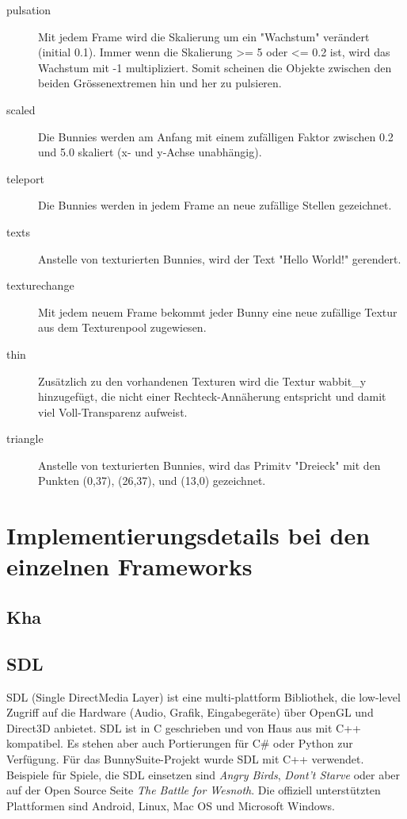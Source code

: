 \begin{description}
\item[pulsation] Mit jedem Frame wird die Skalierung um ein "Wachstum" verändert (initial 0.1). Immer wenn die Skalierung \textgreater= 5 oder \textless= 0.2 ist, wird das Wachstum mit -1 multipliziert. Somit scheinen die Objekte zwischen den beiden Grössenextremen hin und her zu pulsieren. \\
\item[scaled] Die Bunnies werden am Anfang mit einem zufälligen Faktor zwischen 0.2 und 5.0 skaliert (x- und y-Achse unabhängig). \\
\item[teleport] Die Bunnies werden in jedem Frame an neue zufällige Stellen gezeichnet. \\
\item[texts] Anstelle von texturierten Bunnies, wird der Text "Hello World!" gerendert. \\
\item[texturechange] Mit jedem neuem Frame bekommt jeder Bunny eine neue zufällige Textur aus dem Texturenpool zugewiesen. \\
\item[thin] Zusätzlich zu den vorhandenen Texturen wird die Textur wabbit\_y hinzugefügt, die nicht einer Rechteck-Annäherung entspricht und damit viel Voll-Transparenz aufweist. \\
\item[triangle] Anstelle von texturierten Bunnies, wird das Primitv "Dreieck" mit den Punkten (0,37), (26,37), und (13,0) gezeichnet.
\end{description}

\section{Implementierungsdetails bei den einzelnen Frameworks}
\subsection{Kha}

\subsection{SDL}
SDL (Single DirectMedia Layer) ist eine multi-plattform Bibliothek, die low-level Zugriff auf die Hardware (Audio, Grafik, Eingabegeräte) über OpenGL und Direct3D anbietet. SDL ist in C geschrieben und von Haus aus mit C++ kompatibel. Es stehen aber auch Portierungen für C\# oder Python zur Verfügung. Für das BunnySuite-Projekt wurde SDL mit C++ verwendet. Beispiele für Spiele, die SDL einsetzen sind \emph{Angry Birds}, \emph{Dont't Starve} oder aber auf der Open Source Seite \emph{The Battle for Wesnoth}. Die offiziell unterstützten Plattformen sind Android, Linux, Mac OS und Microsoft Windows.

